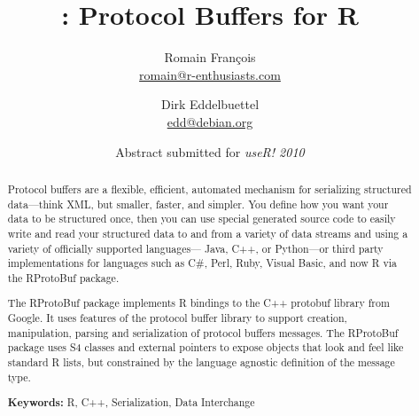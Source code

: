 \documentclass[11pt]{article}
\author{
Romain Fran\c{c}ois\\ {\small \url{romain@r-enthusiasts.com} } \and
Dirk Eddelbuettel\\ {\small \url{edd@debian.org} }
}
\title{\pkg{RProtoBuf}: Protocol Buffers for R }
\date{Abstract submitted for \textsl{useR! 2010}}
\newcommand{\proglang}[1]{\textsf{#1}}
\newcommand{\pkg}[1]{{\fontseries{b}\selectfont #1}}
\begin{document}
\maketitle
\thispagestyle{empty}
\begin{abstract}
  \addtolength{\parskip}{\baselineskip} 	%
  \noindent %
  Protocol buffers are a flexible, efficient, 
  automated mechanism for serializing structured data---think XML, but 
  smaller, faster, and simpler. 
  You define how you want your data to be structured once, then you can use 
  special generated source code to easily write and read your structured 
  data to and from a variety of data streams and using a 
  variety of officially supported languages---
  \proglang{Java}, \proglang{C++}, or \proglang{Python}---or 
  third party implementations for languages such as \proglang{C\#}, 
  \proglang{Perl}, \proglang{Ruby}, \proglang{Visual Basic}, and now 
  \proglang{R} via the \pkg{RProtoBuf} package.
  
  The \pkg{RProtoBuf} package implements R bindings to the C++
  protobuf library from Google. It uses features of the protocol 
  buffer library to support creation, manipulation, parsing and serialization
  of protocol buffers messages. The \pkg{RProtoBuf} package uses S4 classes
  and external pointers to expose objects that look and feel like standard 
  R lists, but constrained by the language agnostic definition of the 
  message type.
  
  
  
  \noindent \textbf{Keywords:}  
  \proglang{R}, \proglang{C++}, Serialization, Data Interchange
\end{abstract}
\end{document}
